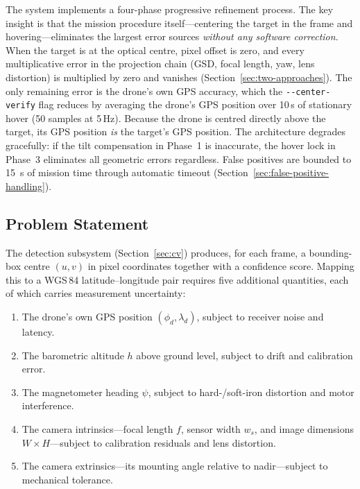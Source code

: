 \noindent The system implements a four-phase progressive refinement process.  The key insight is that the mission procedure itself---centering the target in the frame and hovering---eliminates the largest error sources \emph{without any software correction}.  When the target is at the optical centre, pixel offset is zero, and every multiplicative error in the projection chain (GSD, focal length, yaw, lens distortion) is multiplied by zero and vanishes (Section~\ref{sec:two-approaches}).  The only remaining error is the drone's own GPS accuracy, which the \texttt{-{}-center-verify} flag reduces by averaging the drone's GPS position over 10\,s of stationary hover (50 samples at 5\,Hz).  Because the drone is centred directly above the target, its GPS position \emph{is} the target's GPS position.  The architecture degrades gracefully: if the tilt compensation in Phase~1 is inaccurate, the hover lock in Phase~3 eliminates all geometric errors regardless.  False positives are bounded to \SI{15}{\second} of mission time through automatic timeout (Section~\ref{sec:false-positive-handling}).

\subsection{Problem Statement}\label{sec:gps-problem}

The detection subsystem (Section~\ref{sec:cv}) produces, for each frame, a bounding-box centre $(u,v)$ in pixel coordinates together with a confidence score.  Mapping this to a WGS\,84 latitude--longitude pair requires five additional quantities, each of which carries measurement uncertainty:

\begin{enumerate}
  \item The drone's own GPS position $(\phi_d, \lambda_d)$, subject to receiver noise and latency.
  \item The barometric altitude $h$ above ground level, subject to drift and calibration error.
  \item The magnetometer heading $\psi$, subject to hard-/soft-iron distortion and motor interference.
  \item The camera intrinsics---focal length $f$, sensor width $w_s$, and image dimensions $W \times H$---subject to calibration residuals and lens distortion.
  \item The camera extrinsics---its mounting angle relative to nadir---subject to mechanical tolerance.
\end{enumerate}

